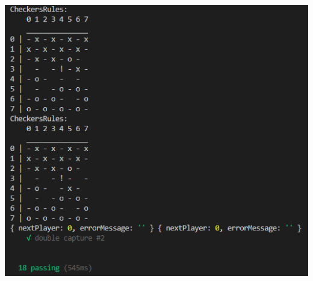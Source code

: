 \documentclass[12pt,a4paper,bibliography=totocnumbered,listof=totocnumbered]{article}
\begin{document}
\vspace{1em}
\begin{minipage}{\linewidth}
	\centering
	\includegraphics[width=0.6\linewidth]{pics/UnitTestResult.png}
	\label{fig:UnitTestResult}
\end{minipage}
\end{document}
